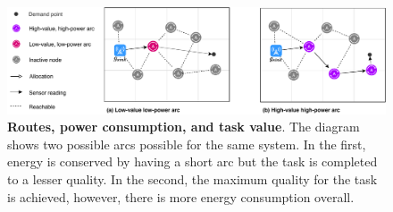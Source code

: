\begin{figure}[ht]
	\centering
	\includegraphics[width=0.9\linewidth]{route-types}
	\caption{\textbf{Routes, power consumption, and task value}. The diagram shows two possible arcs possible for the same system. In the first, energy is conserved by having a short arc but the task is completed to a lesser quality. In the second, the maximum quality for the task is achieved, however, there is more energy consumption overall.}
	\label{fig:route_types}
\end{figure}

